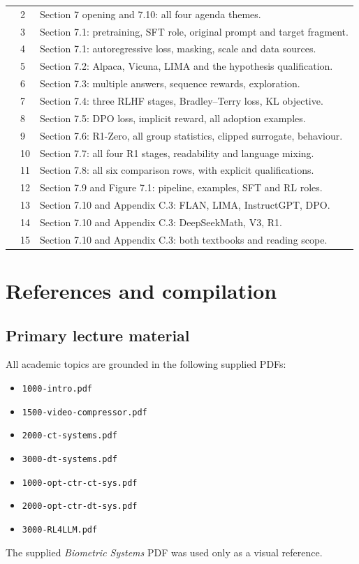 \documentclass[11pt,a4paper]{article}
\numberwithin{equation}{section}
\numberwithin{figure}{section}
\numberwithin{table}{section}
\begin{document}
\begin{longtable}{@{}P{29mm}P{14mm}P{105mm}@{}}
 & 2 & Section 7 opening and 7.10: all four agenda themes.\\
 & 3 & Section 7.1: pretraining, SFT role, original prompt and target fragment.\\
 & 4 & Section 7.1: autoregressive loss, masking, scale and data sources.\\
 & 5 & Section 7.2: Alpaca, Vicuna, LIMA and the hypothesis qualification.\\
 & 6 & Section 7.3: multiple answers, sequence rewards, exploration.\\
 & 7 & Section 7.4: three RLHF stages, Bradley--Terry loss, KL objective.\\
 & 8 & Section 7.5: DPO loss, implicit reward, all adoption examples.\\
 & 9 & Section 7.6: R1-Zero, all group statistics, clipped surrogate, behaviour.\\
 & 10 & Section 7.7: all four R1 stages, readability and language mixing.\\
 & 11 & Section 7.8: all six comparison rows, with explicit qualifications.\\
 & 12 & Section 7.9 and Figure 7.1: pipeline, examples, SFT and RL roles.\\
 & 13 & Section 7.10 and Appendix C.3: FLAN, LIMA, InstructGPT, DPO.\\
 & 14 & Section 7.10 and Appendix C.3: DeepSeekMath, V3, R1.\\
 & 15 & Section 7.10 and Appendix C.3: both textbooks and reading scope.\\
\bottomrule\end{longtable}\normalsize

\clearpage
\section{References and compilation}\label{app:references}
\subsection{Primary lecture material}
All academic topics are grounded in the following supplied PDFs:
\begin{itemize}
\item \texttt{1000-intro.pdf}
\item \texttt{1500-video-compressor.pdf}
\item \texttt{2000-ct-systems.pdf}
\item \texttt{3000-dt-systems.pdf}
\item \texttt{1000-opt-ctr-ct-sys.pdf}
\item \texttt{2000-opt-ctr-dt-sys.pdf}
\item \texttt{3000-RL4LLM.pdf}
\end{itemize}
The supplied \emph{Biometric Systems} PDF was used only as a visual reference.
\end{document}

